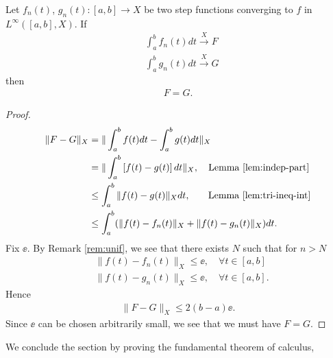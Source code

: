 %
%
\begin{lemma}[Independence]
  Let $f_{n}(t)$, $g_{n}(t) : [a,b] \to X$
  be two step functions converging to $f$ in $L^{\infty}([a,b], X)$.
  If
  \begin{equation*}
  \begin{split}
    & \int_{a}^{b} f_{n}(t) dt \xrightarrow{X} F
    \\
    & \int_{a}^{b} g_{n}(t) dt \xrightarrow{X} G
  \end{split}
  \end{equation*}
  then
  \begin{equation*}
  \begin{split}
    F =G.
  \end{split}
  \end{equation*}
\label{lem:well-def}
\end{lemma}
%
%
%
%
%
%
\begin{proof}
%
%
\begin{equation*}
\begin{split}
  \| F - G \|_{X} & = \| \int_{a}^{b} f(t) dt - \int_{a}^{b} g(t) dt \|_{X}
  \\
  & = \| \int_{a}^{b}\left[ f(t) - g(t) \right]dt \|_{X}, \quad \text{Lemma
  \ref{lem:indep-part}}
  \\
  & \le \int_{a}^{b} \| f(t) - g(t) \|_{X} dt,
  \quad \phantom{m} \text{Lemma \ref{lem:tri-ineq-int}}
  \\
  & \le \int_{a}^{b} (\| f(t) - f_{n}(t) \|_{X} + \| f(t) - g_{n}(t) \|_{X})dt.
\end{split}
\end{equation*}
%
%
Fix $\ee$. By Remark \ref{rem:unif}, we see that there exists $N$ such
that for $n > N$
%
%
\begin{equation*}
\begin{split}
& \| f(t) - f_{n}(t) \|_{X} \le \ee, \quad \forall t \in [a, b]
\\
& \| f(t) - g_{n}(t) \|_{X} \le \ee, \quad \forall t \in [a, b].
\end{split}
\end{equation*}
%
%
Hence
%
%
\begin{equation*}
\begin{split}
\| F - G \|_{X} \le 2(b-a) \ee.
\end{split}
\end{equation*}
%
%
Since $\ee$ can be chosen arbitrarily small, we see that we must have $F = G$.
\end{proof}
%
%
We conclude the section by proving the fundamental theorem of calculus, 
